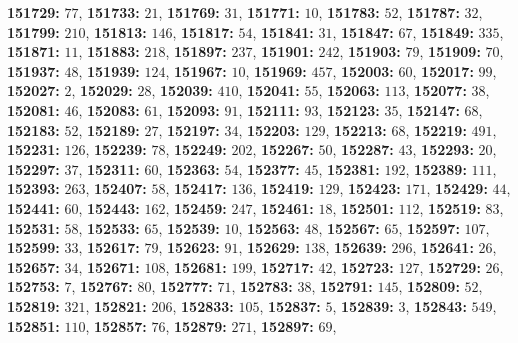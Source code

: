 \textsf{\bfseries 151729:} $77$, \textsf{\bfseries 151733:} $21$, \textsf{\bfseries 151769:} $31$, \textsf{\bfseries 151771:} $10$, \textsf{\bfseries 151783:} $52$, \textsf{\bfseries 151787:} $32$, \textsf{\bfseries 151799:} $210$, \textsf{\bfseries 151813:} $146$, \textsf{\bfseries 151817:} $54$, \textsf{\bfseries 151841:} $31$, \textsf{\bfseries 151847:} $67$, \textsf{\bfseries 151849:} $335$, \textsf{\bfseries 151871:} $11$, \textsf{\bfseries 151883:} $218$, \textsf{\bfseries 151897:} $237$, \textsf{\bfseries 151901:} $242$, \textsf{\bfseries 151903:} $79$, \textsf{\bfseries 151909:} $70$, \textsf{\bfseries 151937:} $48$, \textsf{\bfseries 151939:} $124$, \textsf{\bfseries 151967:} $10$, \textsf{\bfseries 151969:} $457$, \textsf{\bfseries 152003:} $60$, \textsf{\bfseries 152017:} $99$, \textsf{\bfseries 152027:} $2$, \textsf{\bfseries 152029:} $28$, \textsf{\bfseries 152039:} $410$, \textsf{\bfseries 152041:} $55$, \textsf{\bfseries 152063:} $113$, \textsf{\bfseries 152077:} $38$, \textsf{\bfseries 152081:} $46$, \textsf{\bfseries 152083:} $61$, \textsf{\bfseries 152093:} $91$, \textsf{\bfseries 152111:} $93$, \textsf{\bfseries 152123:} $35$, \textsf{\bfseries 152147:} $68$, \textsf{\bfseries 152183:} $52$, \textsf{\bfseries 152189:} $27$, \textsf{\bfseries 152197:} $34$, \textsf{\bfseries 152203:} $129$, \textsf{\bfseries 152213:} $68$, \textsf{\bfseries 152219:} $491$, \textsf{\bfseries 152231:} $126$, \textsf{\bfseries 152239:} $78$, \textsf{\bfseries 152249:} $202$, \textsf{\bfseries 152267:} $50$, \textsf{\bfseries 152287:} $43$, \textsf{\bfseries 152293:} $20$, \textsf{\bfseries 152297:} $37$, \textsf{\bfseries 152311:} $60$, \textsf{\bfseries 152363:} $54$, \textsf{\bfseries 152377:} $45$, \textsf{\bfseries 152381:} $192$, \textsf{\bfseries 152389:} $111$, \textsf{\bfseries 152393:} $263$, \textsf{\bfseries 152407:} $58$, \textsf{\bfseries 152417:} $136$, \textsf{\bfseries 152419:} $129$, \textsf{\bfseries 152423:} $171$, \textsf{\bfseries 152429:} $44$, \textsf{\bfseries 152441:} $60$, \textsf{\bfseries 152443:} $162$, \textsf{\bfseries 152459:} $247$, \textsf{\bfseries 152461:} $18$, \textsf{\bfseries 152501:} $112$, \textsf{\bfseries 152519:} $83$, \textsf{\bfseries 152531:} $58$, \textsf{\bfseries 152533:} $65$, \textsf{\bfseries 152539:} $10$, \textsf{\bfseries 152563:} $48$, \textsf{\bfseries 152567:} $65$, \textsf{\bfseries 152597:} $107$, \textsf{\bfseries 152599:} $33$, \textsf{\bfseries 152617:} $79$, \textsf{\bfseries 152623:} $91$, \textsf{\bfseries 152629:} $138$, \textsf{\bfseries 152639:} $296$, \textsf{\bfseries 152641:} $26$, \textsf{\bfseries 152657:} $34$, \textsf{\bfseries 152671:} $108$, \textsf{\bfseries 152681:} $199$, \textsf{\bfseries 152717:} $42$, \textsf{\bfseries 152723:} $127$, \textsf{\bfseries 152729:} $26$, \textsf{\bfseries 152753:} $7$, \textsf{\bfseries 152767:} $80$, \textsf{\bfseries 152777:} $71$, \textsf{\bfseries 152783:} $38$, \textsf{\bfseries 152791:} $145$, \textsf{\bfseries 152809:} $52$, \textsf{\bfseries 152819:} $321$, \textsf{\bfseries 152821:} $206$, \textsf{\bfseries 152833:} $105$, \textsf{\bfseries 152837:} $5$, \textsf{\bfseries 152839:} $3$, \textsf{\bfseries 152843:} $549$, \textsf{\bfseries 152851:} $110$, \textsf{\bfseries 152857:} $76$, \textsf{\bfseries 152879:} $271$, \textsf{\bfseries 152897:} $69$, 
